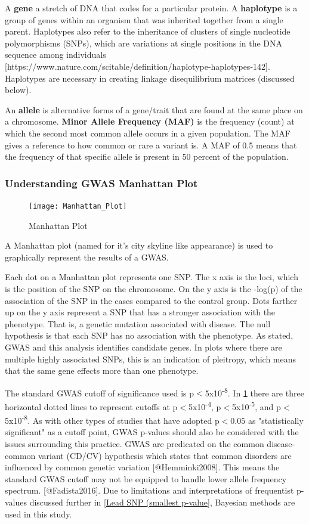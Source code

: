 A \textbf{gene} a stretch of DNA that codes for a particular protein. A \textbf{haplotype} is a group of genes within an organism that was inherited together from a single parent. Haplotypes also refer to the inheritance of clusters of single nucleotide polymorphisms (SNPs), which are variations at single positions in the DNA sequence among individuals [https://www.nature.com/scitable/definition/haplotype-haplotypes-142]. Haplotypes are necessary in creating linkage disequilibrium matrices (discussed below). 

An \textbf{allele} is alternative forms of a gene/trait that are found at the same place on a chromosome. \textbf{Minor Allele Frequency (MAF)} is the frequency (count) at which the second most common allele occurs in a given population. The MAF gives a reference to how common or rare a variant is. A MAF of 0.5 means that the frequency of that specific allele is present in 50 percent of the population.


\subsubsection{Understanding GWAS Manhattan Plot}


\begin{figure}[h]
\centering
\texttt{[image: Manhattan\_Plot]}
\caption{Manhattan Plot}
\label{fig: Manhattan Plot }
\end{figure}

A Manhattan plot (named for it's city skyline like appearance) is used to graphically represent the results of a GWAS. 

Each dot on a Manhattan plot represents one SNP. The x axis is the loci, which is the position of the SNP on the chromosome. On the y axis is the -log(p) of the association of the SNP in the cases compared to the control group. Dots farther up on the y axis represent a SNP that has a stronger association with the phenotype. That is, a genetic mutation associated with disease. The null hypothesis is that each SNP has no association with the phenotype. As stated, GWAS and this analysis identifies candidate genes. In plots where there are multiple highly associated SNPs, this is an indication of pleitropy, which means that the same gene effects more than one phenotype. 

The standard GWAS cutoff of significance used is p$<$5x10\textsuperscript{-8}. In \ref{fig: Manhattan Plot } there are three horizontal dotted lines to represent cutoffs at p$<$5x10\textsuperscript{-4}, p$<$5x10\textsuperscript{-5}, and p$<$5x10\textsuperscript{-8}.  As with other types of studies that have adopted p$<0.05$ as "statistically significant" as a cutoff point, GWAS p-values should also be considered with the issues surrounding this practice. 
GWAS are predicated on the common disease-common variant (CD/CV) hypothesis which states that common disorders are influenced by common genetic variation [@Hemminki2008]. This means the standard GWAS cutoff may not be equipped to handle lower allele frequency spectrum. [@Fadista2016]. Due to limitations and interpretations of frequentist p-values discussed further in \ref{Lead SNP (smallest p-value}, Bayesian methods are used in this study. 

